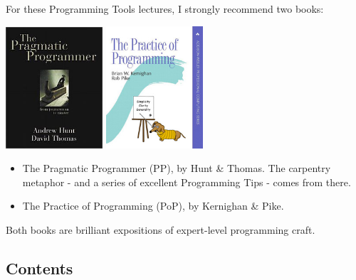 \documentclass[aspectratio=169]{beamer}
\begin{document}
\begin{frame}

For these Programming Tools lectures, I strongly recommend two books:

\begin{center}
	\includegraphics[width=0.27\textwidth]{tpp}
	\hspace{2cm}
	\includegraphics[width=0.27\textwidth]{tpop}
\end{center}

    \begin{itemize}
    \item
    \alert{The Pragmatic Programmer (PP)}, by \alert{Hunt \& Thomas}.
    The carpentry metaphor - and a series of excellent Programming Tips -
    comes from there.

    \pause
    \item
    \alert{The Practice of Programming (PoP)}, by \alert{Kernighan \& Pike}.

    \end{itemize}

    Both books are brilliant expositions of expert-level
    programming craft.
\end{frame}

\subsection{Contents}
\end{document}
